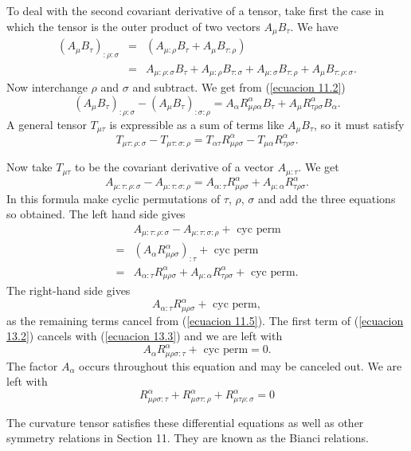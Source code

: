 To deal with the second covariant derivative of a tensor, take first the case in which the tensor is the outer product 
of two vectors $A_{\mu} B_{\tau}$. We have
\[
\begin{array}{rcl}
 \left( A_{\mu} B_{\tau}\right)_{:\rho:\sigma} & = & \left( A_{\mu:\rho} B_{\tau} + A_{\mu} B_{\tau:\rho} \right)\\
      & = & A_{\mu:\rho:\sigma} B_{\tau} + A_{\mu:\rho} B_{\tau:\sigma} + A_{\mu:\sigma} B_{\tau:\rho} 
      + A_{\mu} B_{\tau:\rho:\sigma}.
\end{array}
\]
Now interchange $\rho$ and $\sigma$ and subtract. We get from (\ref{ecuacion 11.2})
\[
\left( A_{\mu} B_{\tau}\right)_{:\rho:\sigma} - \left( A_{\mu} B_{\tau}\right)_{:\sigma:\rho} = 
   A_{\alpha}R^{\alpha}_{\mu\rho\alpha} B_{\tau} + A_{\mu}R^{\alpha}_{\tau\rho\sigma} B_{\alpha}.
\]
A general tensor $T_{\mu\tau}$ is expressible as a sum of terms like $A_{\mu} B_{\tau}$, so it must satisfy
\begin{equation}
 \label{ecuacion 13.1}
 T_{\mu\tau:\rho:\sigma} - T_{\mu\tau:\sigma:\rho} =
 T_{\alpha\tau}R^{\alpha}_{\mu\rho\sigma} - T_{\mu\alpha}R^{\alpha}_{\tau\rho\sigma}.
\end{equation}

Now take $T_{\mu\tau}$ to be the covariant derivative of a vector $A_{\mu:\tau}$. We get
\[
A_{\mu:\tau:\rho:\sigma} - A_{\mu:\tau:\sigma:\rho}
= A_{\alpha:\tau} R^{\alpha}_{\mu\rho\sigma} + A_{\mu:\alpha} R^{\alpha}_{\tau\rho\sigma}.
\]
In this formula make cyclic permutations of $\tau$, $\rho$, $\sigma$ and add the three equations so obtained. The left 
hand side gives
\begin{equation}
 \label{ecuacion 13.2}
    \begin{array}{cl}
          & A_{\mu:\tau:\rho:\sigma} - A_{\mu:\tau:\sigma:\rho} + \mbox{ cyc perm} \\
        = & \left( A_{\alpha} R^{\alpha}_{\mu\rho\sigma} \right)_{:\tau} + \mbox{ cyc perm} \\
        = & A_{\alpha:\tau} R^{\alpha}_{\mu\rho\sigma} + A_{\mu:\alpha} R^{\alpha}_{\tau\rho\sigma}
        + \mbox{ cyc perm}.
    \end{array}
\end{equation}
The right-hand side gives 
\begin{equation}
 \label{ecuacion 13.3}
    A_{\alpha:\tau} R^{\alpha}_{\mu\rho\sigma} + \mbox{ cyc perm},
\end{equation}
as the remaining terms cancel from (\ref{ecuacion 11.5}). The first term of (\ref{ecuacion 13.2}) cancels with 
(\ref{ecuacion 13.3}) and we are left with
\[
   A_{\alpha} R^{\alpha}_{\mu\rho\sigma:\tau} + \mbox{ cyc perm} = 0.
\]
The factor $A_{\alpha}$ occurs throughout this equation and may be canceled out. We are left with
\begin{equation}
 \label{ecuacion 13.4}
 R^{\alpha}_{\mu\rho\sigma:\tau} + 
 R^{\alpha}_{\mu\sigma\tau:\rho} + 
 R^{\alpha}_{\mu\tau\rho:\sigma} = 0
\end{equation}

The curvature tensor satisfies these differential equations as well as other symmetry relations in Section 11. They are 
known as the Bianci relations.
